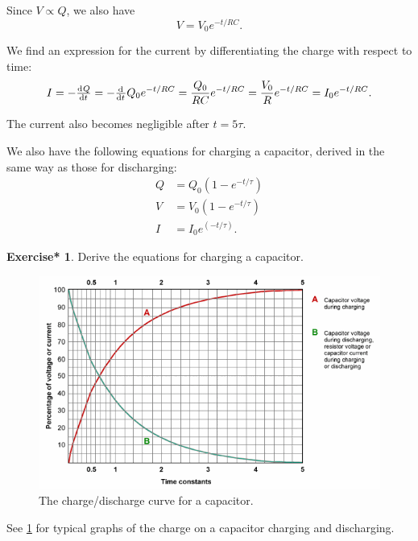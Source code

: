 \documentclass[a4paper]{amsbook}
\theoremstyle{definition}
\numberwithin{exercise}{chapter}
\newtheorem{exercise*}[exercise]{Exercise*}
\numberwithin{exercise}{chapter}
\begin{document}
Since $ V \propto Q $, we also have
\begin{equation}
  V = V_0 e^{-t/RC}.
\end{equation}

We find an expression for the current by differentiating the charge with respect to time:
\begin{equation}
  I = -\od{Q}{t} = -\od{}{t} Q_0 e^{-t/RC} = \frac{Q_0}{RC} e^{-t/RC} = \frac{V_0}{R} e^{-t/RC} = I_0 e^{-t/RC}.
\end{equation}

The current also becomes negligible after $ t = 5\tau $.

We also have the following equations for charging a capacitor, derived in the same way as those for discharging:
\begin{align}
  Q &= Q_0 (1 - e^{-t/\tau})\\
  V &= V_0 (1 - e^{-t/\tau})\\
  I &= I_0 e^{(-t/\tau)}.
\end{align}

\begin{exercise*}
  Derive the equations for charging a capacitor.
\end{exercise*}

\begin{figure}
  \centering
  \includegraphics[width=\textwidth]{capcharge}
  \caption{The charge/discharge curve for a capacitor.}\label{fig:capcharge}
\end{figure}

See \cref{fig:capcharge} for typical graphs of the charge on a capacitor charging and discharging.
\end{document}
